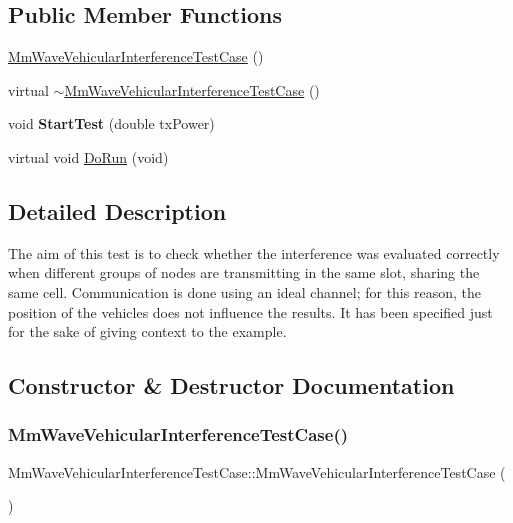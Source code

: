 \subsection*{Public Member Functions}
\begin{DoxyCompactItemize}
\item 
\hyperlink{classMmWaveVehicularInterferenceTestCase_af7e416628ec4412169240c22f47cc785}{Mm\+Wave\+Vehicular\+Interference\+Test\+Case} ()
\item 
virtual \hyperlink{classMmWaveVehicularInterferenceTestCase_af0c78db7e4ee5ea2f82747b18c5b46c7}{$\sim$\+Mm\+Wave\+Vehicular\+Interference\+Test\+Case} ()
\item 
\mbox{\label{classMmWaveVehicularInterferenceTestCase_a0a52ef59129cd60bee461c7b63df69a7}} 
void {\bfseries Start\+Test} (double tx\+Power)
\item 
virtual void \hyperlink{classMmWaveVehicularInterferenceTestCase_aa69fae32e19bdd74449c9fb9de554a9f}{Do\+Run} (void)
\end{DoxyCompactItemize}


\subsection{Detailed Description}
The aim of this test is to check whether the interference was evaluated correctly when different groups of nodes are transmitting in the same slot, sharing the same cell. Communication is done using an ideal channel; for this reason, the position of the vehicles does not influence the results. It has been specified just for the sake of giving context to the example. 

\subsection{Constructor \& Destructor Documentation}
\mbox{\label{classMmWaveVehicularInterferenceTestCase_af7e416628ec4412169240c22f47cc785}} 
\subsubsection{\texorpdfstring{Mm\+Wave\+Vehicular\+Interference\+Test\+Case()}{MmWaveVehicularInterferenceTestCase()}}
{\footnotesize\ttfamily Mm\+Wave\+Vehicular\+Interference\+Test\+Case\+::\+Mm\+Wave\+Vehicular\+Interference\+Test\+Case (\begin{DoxyParamCaption}{ }\end{DoxyParamCaption})}

